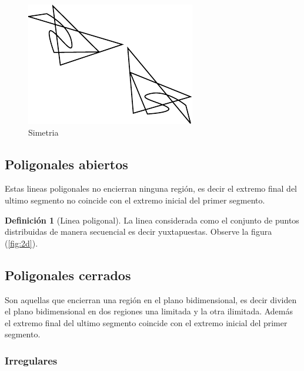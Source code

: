 \documentclass[16pt,]{krantz}
\theoremstyle{definition}
\newtheorem{definition}{Definición}[chapter]
\theoremstyle{definition}
\theoremstyle{definition}
\theoremstyle{definition}
\theoremstyle{remark}
\begin{document}
\begin{figure}[!ht]

{\centering \includegraphics{simetria} 

}

\caption{Simetria}\label{fig:simetria}
\end{figure}

\hypertarget{poligonales-abiertos}{%
\subsection{Poligonales abiertos}\label{poligonales-abiertos}}

Estas lineas poligonales no encierran ninguna región, es decir el extremo final del ultimo segmento no coincide con el extremo inicial del primer segmento.

\begin{definition}[Linea poligonal]
\protect\hypertarget{def:poligono}{}{\label{def:poligono} {} }La linea considerada como el conjunto de puntos distribuidas de manera secuencial es decir yuxtapuestas. Observe la figura (\ref{fig:2d}).
\end{definition}

\hypertarget{poligonales-cerrados}{%
\subsection{Poligonales cerrados}\label{poligonales-cerrados}}

Son aquellas que encierran una región en el plano bidimensional, es decir dividen el plano bidimensional en dos regiones una limitada y la otra ilimitada. Además el extremo final del ultimo segmento coincide con el extremo inicial del primer segmento.

\hypertarget{irregulares}{%
\subsubsection{Irregulares}\label{irregulares}}
\end{document}
